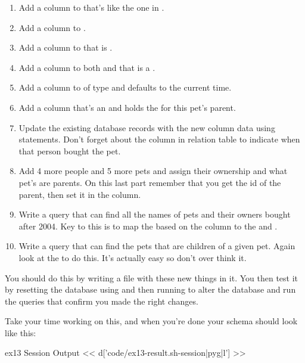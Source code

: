 \begin{enumerate}
\item Add a  column to  that's like the one in .
\item Add a  column to .
\item Add a  column to  that is .
\item Add a  column to both  and  that is a .
\item Add a  column to  of type  and defaults to the
    current time.
\item Add a  column that's an  and holds the 
    for this pet's parent.
\item Update the existing database records with the new column data using  statements.  Don't forget about the  column in  relation table to indicate when that person bought the pet.
\item Add 4 more people and 5 more pets and assign their ownership and what pet's
    are parents.  On this last part remember that you get the id of the parent, then
    set it in the  column.
\item Write a query that can find all the names of pets and their owners bought after
    2004. Key to this is to map the  based on the  column to the  and .
\item Write a query that can find the pets that are children of a given pet.  Again
    look at the  to do this.  It's actually easy so don't over
    think it.
\end{enumerate}

You should do this by writing a  file with these new things in it.
You then test it by resetting the database using  and then running
 to alter the database and run the  queries that
confirm you made the right changes.

Take your time working on this, and when you're done your schema should look
like this:

\begin{code}{ex13 Session Output}
<< d['code/ex13-result.sh-session|pyg|l'] >>
\end{code}

